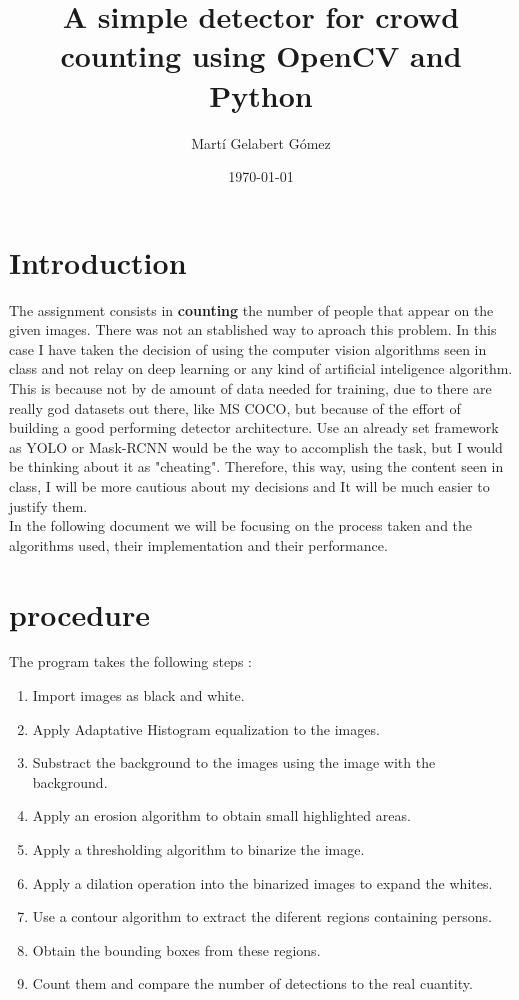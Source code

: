 \documentclass[10pt]{article}
\begin{document}
\title{A simple detector for crowd counting using OpenCV and Python}
\author{Martí Gelabert Gómez}
\date{\today}
\maketitle

\tableofcontents

\section{Introduction}
The assignment consists in \textbf{counting} the number of people that appear on the given images. There was not an stablished way to aproach this problem. In this case I have taken the decision of using the computer vision algorithms seen in class and not relay on deep learning or any kind of artificial inteligence algorithm. This is because not by de amount of data needed for training, due to there are really god datasets out there, like MS COCO, but because of the effort of building a good performing detector architecture. Use an already set framework as YOLO or Mask-RCNN would be the way to accomplish the task, but I would be thinking about it as "cheating". Therefore, this way, using the content seen in class, I will be more cautious about my decisions and It will be much easier to justify them.\\

In the following document  we will be focusing on the process taken and the algorithms used, their implementation and their performance.        

\section{procedure}
The program takes the following steps :

\begin{enumerate}
    \item Import images as black and white.
    \item Apply Adaptative Histogram equalization to the images.
    \item Substract the background to the images using the image with the background.
    \item Apply an erosion algorithm to obtain small highlighted areas.
    \item Apply a thresholding algorithm to binarize the image.
    \item Apply a dilation operation into the binarized images to expand the whites.
    \item Use a contour algorithm to extract the diferent regions containing persons.
    \item Obtain the bounding boxes from these regions.
    \item Count them and compare the number of detections to the real cuantity.
    \end{enumerate}
    
\end{document}
